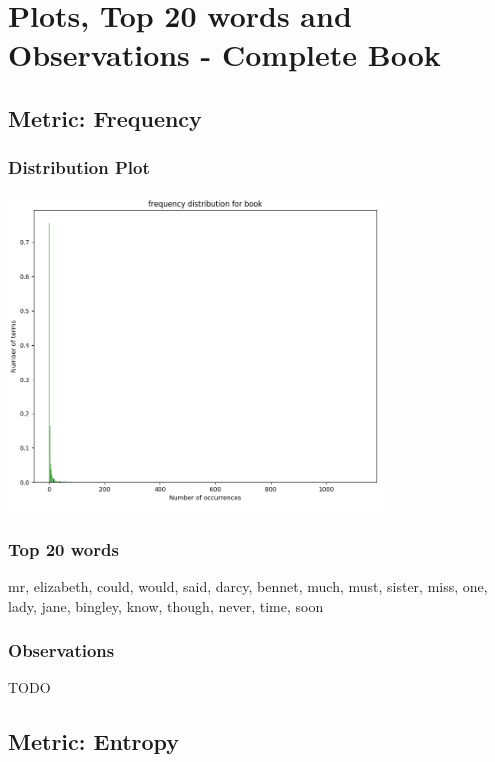 \documentclass{article}
\begin{document}
\section{Plots, Top 20 words and Observations - Complete Book}
\subsection{Metric: Frequency}
\subsubsection{Distribution Plot}
\begin{flushleft}
	\includegraphics[width=0.75\textwidth]{./images/frequency-distribution-book.png}
\end{flushleft}
\subsubsection{Top 20 words}
\begin{flushleft}
	mr, elizabeth, could, would, said, darcy, bennet, much, must, sister, miss, one, lady, jane, bingley, know, though, never, time, soon
\end{flushleft}
\subsubsection{Observations}
TODO

\newpage
\subsection{Metric: Entropy}
\end{document}
